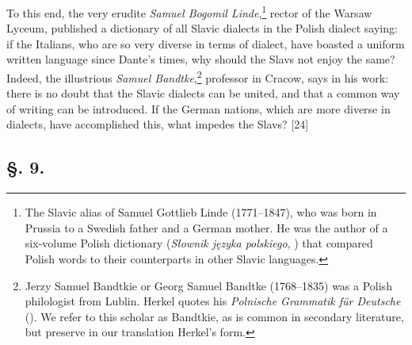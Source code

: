 To this end, the very erudite \textit{Samuel Bogomil Linde},\footnote{The Slavic alias of Samuel Gottlieb Linde (1771--1847), who was born in Prussia to a Swedish father and a German mother. He was the author of a six-volume Polish dictionary (\textit{Słownik języka polskiego}, \citeyear{linde_slownik_18071814}) that compared Polish words to their counterparts in other Slavic languages.} rector of the Warsaw Lyce\-um, published a dictionary of all Slavic dialects in the Polish dialect saying: if the Italians, who are so very diverse in terms of dialect, have boasted a uniform written language since Dante’s times, why should the Slavs not enjoy the same? Indeed, the illustrious \textit{Samuel Bandtke},\footnote{Jerzy Samuel Bandtkie or Georg Samuel Bandtke (1768--1835) was a Polish philologist from Lublin. Herkel quotes his \textit{Polnische Grammatik für Deutsche} (\citeyear{bandtkie_polnische_1824}). We refer to this scholar as Bandtkie, as is common in secondary literature, but preserve in our translation Herkel’s form.} professor in Cracow, says in his work: there is no doubt that the Slavic dialects can be united, and that a common way of writing can be introduced. If the German nations, which are more diverse in dialects, have accomplished this, what impedes the Slavs? [24]

\subsection*{\hspace*{\fill}§. 9.\hspace*{\fill}}

